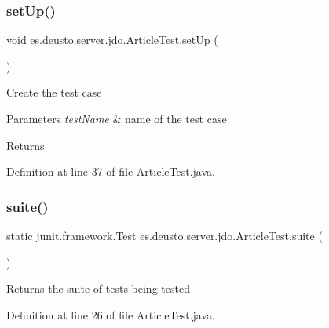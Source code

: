 \subsubsection{\texorpdfstring{set\+Up()}{setUp()}}
{\footnotesize\ttfamily void es.\+deusto.\+server.\+jdo.\+Article\+Test.\+set\+Up (\begin{DoxyParamCaption}{ }\end{DoxyParamCaption})}

Create the test case


\begin{DoxyParams}{Parameters}
{\em test\+Name} & name of the test case \\
\hline
\end{DoxyParams}
\begin{DoxyReturn}{Returns}

\end{DoxyReturn}


Definition at line 37 of file Article\+Test.\+java.

\mbox{\label{classes_1_1deusto_1_1server_1_1jdo_1_1_article_test_a34b33e76c351fad2110b14191ad00c6b}} 
\subsubsection{\texorpdfstring{suite()}{suite()}}
{\footnotesize\ttfamily static junit.\+framework.\+Test es.\+deusto.\+server.\+jdo.\+Article\+Test.\+suite (\begin{DoxyParamCaption}{ }\end{DoxyParamCaption})\hspace{0.3cm}{\ttfamily [static]}}

\begin{DoxyReturn}{Returns}
the suite of tests being tested 
\end{DoxyReturn}


Definition at line 26 of file Article\+Test.\+java.

\mbox{\label{classes_1_1deusto_1_1server_1_1jdo_1_1_article_test_aebd6492407d7e7c8cb5d5d848a215b32}} 
